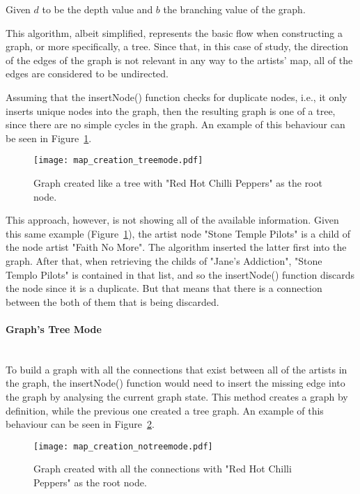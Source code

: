       Given $d$ to be the depth value and $b$ the branching value of the graph.

      This algorithm, albeit simplified, represents the basic flow when constructing a graph, or more specifically, a tree.
      Since that, in this case of study, the direction of the edges of the graph is not relevant in any way to the artists' map, all of the edges are considered to be undirected.

      Assuming that the insertNode() function checks for duplicate nodes, i.e., it only inserts unique nodes into the graph, then the resulting graph is one of a tree, since there are no simple cycles in the graph.
      An example of this behaviour can be seen in Figure~\ref{fig:graph_treemode}.

      \begin{figure}[ht]
        \begin{center}
          \texttt{[image: map\_creation\_treemode.pdf]}
        \end{center}
        \caption{Graph created like a tree with "Red Hot Chilli Peppers" as the root node.}
        \label{fig:graph_treemode}
      \end{figure}

      This approach, however, is not showing all of the available information.
      Given this same example (Figure~\ref{fig:graph_treemode}), the artist node "Stone Temple Pilots" is a child of the node artist "Faith No More".
      The algorithm inserted the latter first into the graph.
      After that, when retrieving the childs of "Jane's Addiction", "Stone Templo Pilots" is contained in that list, and so the insertNode() function discards the node since it is a duplicate.
      But that means that there is a connection between the both of them that is being discarded.

      \paragraph{Graph's Tree Mode} \hfill \\
      To build a graph with all the connections that exist between all of the artists in the graph, the insertNode() function would need to insert the missing edge into the graph by analysing the current graph state.
      This method creates a graph by definition, while the previous one created a tree graph.
      An example of this behaviour can be seen in Figure~\ref{fig:graph_notreemode}.

      \begin{figure}[ht]
        \begin{center}
          \texttt{[image: map\_creation\_notreemode.pdf]}
        \end{center}
        \caption{Graph created with all the connections with "Red Hot Chilli Peppers" as the root node.}
        \label{fig:graph_notreemode}
      \end{figure}

